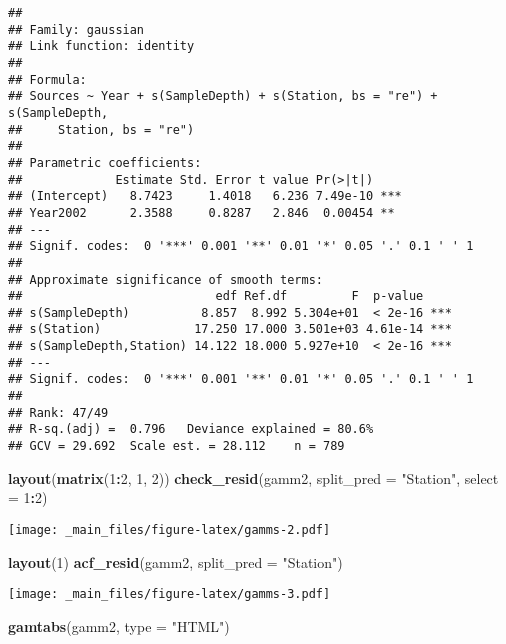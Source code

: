 \documentclass[
]{book}
\newenvironment{Shaded}{\begin{snugshade}}{\end{snugshade}}
\newcommand{\DataTypeTok}[1]{\textcolor[rgb]{0.13,0.29,0.53}{#1}}
\newcommand{\DecValTok}[1]{\textcolor[rgb]{0.00,0.00,0.81}{#1}}
\newcommand{\KeywordTok}[1]{\textcolor[rgb]{0.13,0.29,0.53}{\textbf{#1}}}
\newcommand{\NormalTok}[1]{#1}
\newcommand{\OperatorTok}[1]{\textcolor[rgb]{0.81,0.36,0.00}{\textbf{#1}}}
\newcommand{\StringTok}[1]{\textcolor[rgb]{0.31,0.60,0.02}{#1}}
\begin{document}
\begin{verbatim}
## 
## Family: gaussian 
## Link function: identity 
## 
## Formula:
## Sources ~ Year + s(SampleDepth) + s(Station, bs = "re") + s(SampleDepth, 
##     Station, bs = "re")
## 
## Parametric coefficients:
##             Estimate Std. Error t value Pr(>|t|)    
## (Intercept)   8.7423     1.4018   6.236 7.49e-10 ***
## Year2002      2.3588     0.8287   2.846  0.00454 ** 
## ---
## Signif. codes:  0 '***' 0.001 '**' 0.01 '*' 0.05 '.' 0.1 ' ' 1
## 
## Approximate significance of smooth terms:
##                           edf Ref.df         F  p-value    
## s(SampleDepth)          8.857  8.992 5.304e+01  < 2e-16 ***
## s(Station)             17.250 17.000 3.501e+03 4.61e-14 ***
## s(SampleDepth,Station) 14.122 18.000 5.927e+10  < 2e-16 ***
## ---
## Signif. codes:  0 '***' 0.001 '**' 0.01 '*' 0.05 '.' 0.1 ' ' 1
## 
## Rank: 47/49
## R-sq.(adj) =  0.796   Deviance explained = 80.6%
## GCV = 29.692  Scale est. = 28.112    n = 789
\end{verbatim}

\begin{Shaded}
\begin{Highlighting}[]
\KeywordTok{layout}\NormalTok{(}\KeywordTok{matrix}\NormalTok{(}\DecValTok{1}\OperatorTok{:}\DecValTok{2}\NormalTok{, }\DecValTok{1}\NormalTok{, }\DecValTok{2}\NormalTok{))}
\KeywordTok{check_resid}\NormalTok{(gamm2, }\DataTypeTok{split_pred =} \StringTok{"Station"}\NormalTok{, }\DataTypeTok{select =} \DecValTok{1}\OperatorTok{:}\DecValTok{2}\NormalTok{)}
\end{Highlighting}
\end{Shaded}

\texttt{[image: \_main\_files/figure-latex/gamms-2.pdf]}

\begin{Shaded}
\begin{Highlighting}[]
\KeywordTok{layout}\NormalTok{(}\DecValTok{1}\NormalTok{)}
\KeywordTok{acf_resid}\NormalTok{(gamm2, }\DataTypeTok{split_pred =} \StringTok{"Station"}\NormalTok{)}
\end{Highlighting}
\end{Shaded}

\texttt{[image: \_main\_files/figure-latex/gamms-3.pdf]}

\begin{Shaded}
\begin{Highlighting}[]
\KeywordTok{gamtabs}\NormalTok{(gamm2, }\DataTypeTok{type =} \StringTok{"HTML"}\NormalTok{)}
\end{Highlighting}
\end{Shaded}
\end{document}
